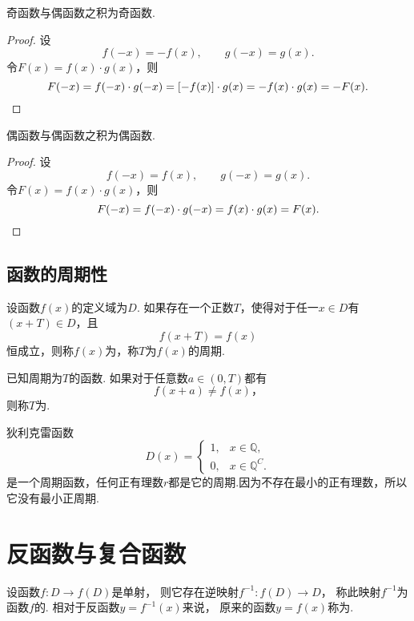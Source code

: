 \begin{property}
奇函数与偶函数之积为奇函数.
\begin{proof}
设\[
f(-x) = -f(x), \qquad g(-x) = g(x).
\]令\(F(x) = f(x) \cdot g(x)\)，则\[
F(-x) = f(-x) \cdot g(-x)
= [-f(x)] \cdot g(x)
= - f(x) \cdot g(x)
= - F(x).
\qedhere
\]
\end{proof}
\end{property}

\begin{property}
偶函数与偶函数之积为偶函数.
\begin{proof}
设\[
f(-x) = f(x), \qquad g(-x) = g(x).
\]令\(F(x) = f(x) \cdot g(x)\)，则\[
F(-x) = f(-x) \cdot g(-x) = f(x) \cdot g(x) = F(x).
\qedhere
\]
\end{proof}
\end{property}

\subsection{函数的周期性}
\begin{definition}
设函数\(f(x)\)的定义域为\(D\).
如果存在一个正数\(T\)，使得对于任一\(x \in D\)有\((x + T) \in D\)，且\[
f(x+ T) = f(x)
\]恒成立，则称\(f(x)\)为，称\(T\)为\(f(x)\)的周期.

已知周期为\(T\)的函数.
如果对于任意数\(a \in (0,T)\)都有\[
f(x + a) \neq f(x)，%
\]则称\(T\)为.
\end{definition}

\begin{example}
狄利克雷函数\[
D(x) = \left\{ \begin{array}{ll}
1, & x \in \mathbb{Q}, \\
0, & x \in \mathbb{Q}^C.
\end{array} \right.
\]是一个周期函数，任何正有理数\(r\)都是它的周期.因为不存在最小的正有理数，所以它没有最小正周期.
\end{example}

\section{反函数与复合函数}
\begin{definition}
设函数\(f\colon D \to f(D)\)是单射，
则它存在逆映射\(f^{-1}: f(D) \to D\)，
称此映射\(f^{-1}\)为函数\(f\)的.
相对于反函数\(y=f^{-1}(x)\)来说，
原来的函数\(y=f(x)\)称为.
\end{definition}

